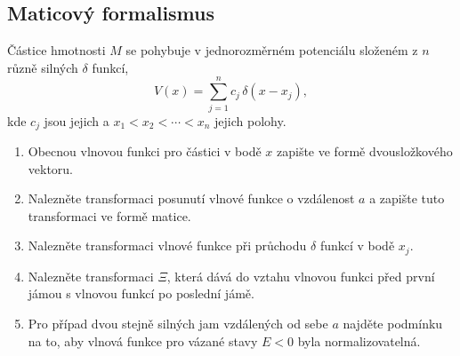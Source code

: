 \subsection{Maticový formalismus}
Částice hmotnosti $M$ se pohybuje v jednorozměrném potenciálu složeném z $n$ různě silných $\delta$ funkcí,
\begin{equation}\label{PotentialSumDelta}
    V(x)=\sum_{j=1}^{n}c_{j}\,\delta(x-x_{j}),
\end{equation}
kde $c_{j}$ jsou jejich  a $x_{1}<x_{2}<\dotsb<x_{n}$ jejich polohy.

\begin{enumerate}
\item
    Obecnou vlnovou funkci pro částici v bodě $x$ zapište ve formě dvousložkového vektoru.
    
\item
    Nalezněte transformaci posunutí vlnové funkce o vzdálenost $a$ a zapište tuto transformaci ve formě matice.
    
\item
    Nalezněte transformaci vlnové funkce při průchodu $\delta$ funkcí v bodě $x_{j}$.
    
\item
    Nalezněte transformaci $\Xi$, která dává do vztahu vlnovou funkci před první jámou s vlnovou funkcí po poslední jámě.
    
\item
    Pro případ dvou stejně silných jam vzdálených od sebe $a$ najděte podmínku na to, aby vlnová funkce pro vázané stavy $E<0$ byla normalizovatelná.
\end{enumerate}
	
